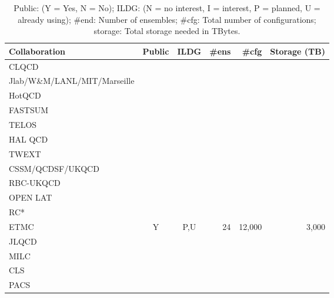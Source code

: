 \documentclass[a4paper,11pt]{article}
\begin{document}
\begin{table}[h]
  \caption{ Public: (Y = Yes, N = No); ILDG: (N = no interest, I =
    interest, P = planned, U = already using); \#end: Number of
    ensembles; \#cfg: Total number of configurations; storage: Total
    storage needed in TBytes.
    \label{tab:summary}
  }
  \centering
  \begin{tabular}{lccrrr}\hline\hline
    Collaboration                & Public & ILDG & \#ens & \#cfg & Storage (TB) \\\hline
    CLQCD                        &        &      &       &       &              \\
    Jlab/W\&M/LANL/MIT/Marseille &        &      &       &       &              \\
    HotQCD                       &        &      &       &       &              \\
    FASTSUM                      &        &      &       &       &              \\
    TELOS                        &        &      &       &       &              \\
    HAL QCD                      &        &      &       &       &              \\
    TWEXT                        &        &      &       &       &              \\
    CSSM/QCDSF/UKQCD             &        &      &       &       &              \\
    RBC-UKQCD                    &        &      &       &       &              \\
    OPEN LAT                     &        &      &       &       &              \\
    RC*                          &        &      &       &       &              \\
    ETMC                         &    Y   &  P,U &  24   &12,000 & 3,000        \\
    JLQCD                        &        &      &       &       &              \\
    MILC                         &        &      &       &       &              \\
    CLS                          &        &      &       &       &              \\
    PACS                         &        &      &       &       &              \\\hline\hline
  \end{tabular}
\end{table}
\end{document}
